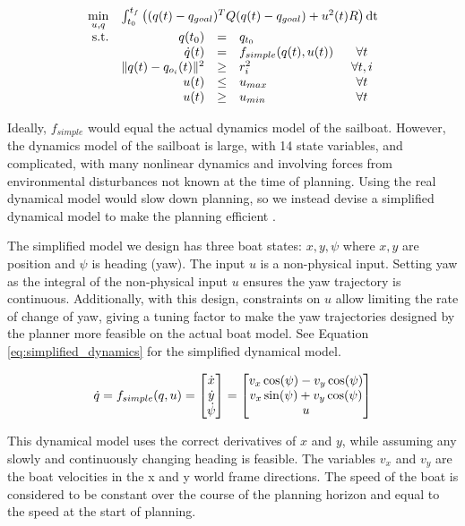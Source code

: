 \documentclass[conference]{IEEEtran}
\begin{document}
\begin{equation}
\begin{array}{rrclc}
\displaystyle \min_{u, q} & \multicolumn{4}{l}{\int_{t_0}^{t_f} \left((q(t)-q_{goal})^T Q (q(t)-q_{goal}) + u^2(t) R \right)\mathrm{dt}} \\
\mathrm{s.t.} & q(t_0) & = & q_{t_0} &\\
& \dot{q}(t) & = & f_{simple}(q(t), u(t)) & \forall t\\
& \|q(t) - q_{o_i}(t)\|^2 & \geq & r_i^2 & \forall t, i\\
& u(t) & \leq & u_{max} & \forall t\\
& u(t) & \geq & u_{min} & \forall t
\end{array}
\label{eq:optimization_problem}
\end{equation}

Ideally, \(f_{simple}\) would equal the actual dynamics model of the sailboat. However, the dynamics model of the sailboat is large, with 14 state variables, and complicated, with many nonlinear dynamics and involving forces from environmental disturbances not known at the time of planning. Using the real dynamical model would slow down planning, so we instead devise a simplified dynamical model to make the planning efficient \cite{Andersson2018}.

The simplified model we design has three boat states: \(x, y, \psi\) where \(x, y\) are position and \(\psi\) is heading (yaw). The input \(u\) is a non-physical input. Setting yaw as the integral of the non-physical input \(u\) ensures the yaw trajectory is continuous. Additionally, with this design, constraints on \(u\) allow limiting the rate of change of yaw, giving a tuning factor to make the yaw trajectories designed by the planner more feasible on the actual boat model. See Equation \ref{eq:simplified_dynamics} for the simplified dynamical model.

\begin{equation}
    \dot{q} = f_{simple}(q, u) = \mqty[\dot{x} \\ \dot{y} \\ \dot{\psi}]
        = \mqty[v_x \cos(\psi) - v_y \cos(\psi) \\ 
    v_x \sin(\psi) + v_y\cos(\psi) \\ 
    u]
    \label{eq:simplified_dynamics}
\end{equation}

This dynamical model uses the correct derivatives of \(x\) and \(y\), while assuming any slowly and continuously changing heading is feasible. The variables \(v_x\) and \(v_y\) are the boat velocities in the x and y world frame directions. The speed of the boat is considered to be constant over the course of the planning horizon and equal to the speed at the start of planning. 
\end{document}
